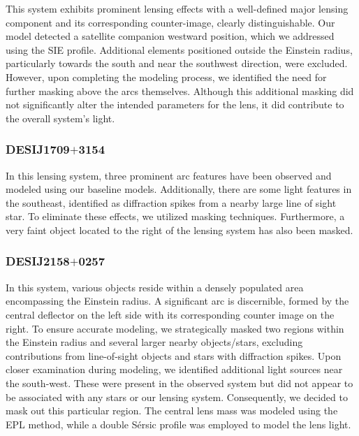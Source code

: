 \documentclass{aa}
\begin{document}
This system exhibits prominent lensing effects with a well-defined major lensing component and its corresponding counter-image, clearly distinguishable. Our model detected a satellite companion westward position, which we addressed using the SIE profile. Additional elements positioned outside the Einstein radius, particularly towards the south and near the southwest direction, were excluded. However, upon completing the modeling process, we identified the need for further masking above the arcs themselves. Although this additional masking did not significantly alter the intended parameters for the lens, it did contribute to the overall system's light.


\subsubsection{DESIJ1709$+$3154}

In this lensing system, three prominent arc features have been observed and modeled using our baseline models. Additionally, there are some light features in the southeast, identified as diffraction spikes from a nearby large line of sight star. To eliminate these effects, we utilized masking techniques. Furthermore, a very faint object located to the right of the lensing system has also been masked.

\subsubsection{DESIJ2158$+$0257}

In this system, various objects reside within a densely populated area encompassing the Einstein radius. A significant arc is discernible, formed by the central deflector on the left side with its corresponding counter image on the right. To ensure accurate modeling, we strategically masked two regions within the Einstein radius and several larger nearby objects/stars, excluding contributions from line-of-sight objects and stars with diffraction spikes. Upon closer examination during modeling, we identified additional light sources near the south-west. These were present in the observed system but did not appear to be associated with any stars or our lensing system. Consequently, we decided to mask out this particular region. The central lens mass was modeled using the EPL method, while a double S\'ersic profile was employed to model the lens light.
\end{document}
